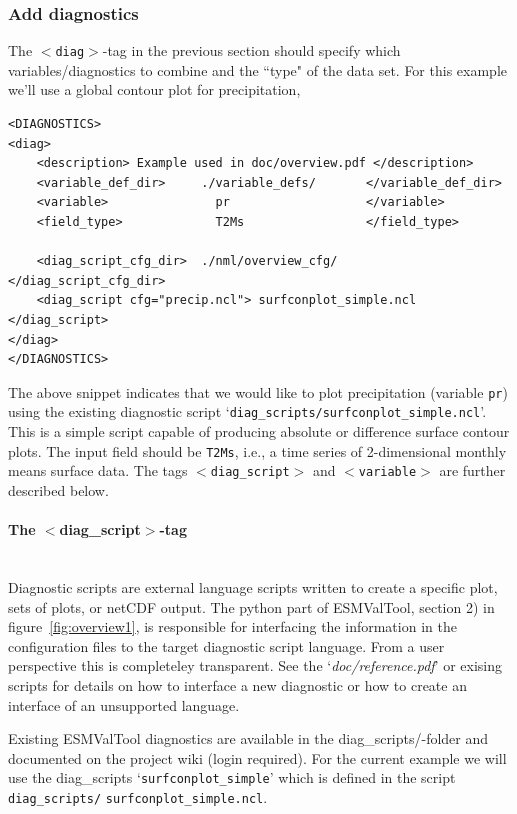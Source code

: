 \documentclass[12pt]{article}
\newcommand{\docref}[1]{`\emph{#1}'}
\newcommand{\xmltag}[1]{\texttt{$<$#1$>$}}
\begin{document}
\subsubsection{Add diagnostics}\label{subsubsection:addDiagnostics}
The \xmltag{diag}-tag in the previous section should specify which
variables/\-diagnostics to combine and the ``type" of the data set.
For this example we'll use a global contour plot for precipitation,
\begin{Verbatim}[frame=single, fontsize=\footnotesize]
<DIAGNOSTICS>
<diag>
    <description> Example used in doc/overview.pdf </description>
    <variable_def_dir>     ./variable_defs/       </variable_def_dir>
    <variable>               pr                   </variable>
    <field_type>             T2Ms                 </field_type>

    <diag_script_cfg_dir>  ./nml/overview_cfg/    </diag_script_cfg_dir>
    <diag_script cfg="precip.ncl"> surfconplot_simple.ncl  </diag_script>
</diag>
</DIAGNOSTICS>
\end{Verbatim}
The above snippet indicates that we would like to plot precipitation
(variable \texttt{pr}) using the existing diagnostic script 
`\texttt{diag\_scripts/surfconplot\_simple.ncl}'. This is a simple
script capable of producing absolute or difference surface contour
plots. The input field should be \texttt{T2Ms}, i.e., a time series of
2-dimen\-sion\-al monthly means surface data. The tags
\xmltag{diag\_script} and \xmltag{variable} are further described
below.

\paragraph{The $<$diag\_script$>$-tag}
~\\
Diagnostic scripts are external language scripts written to create a
specific plot, sets of plots, or netCDF output. The python part of
ESMValTool, section 2) in figure~\ref{fig:overview1}, is responsible
for interfacing the information in the configuration files to the
target diagnostic script language. From a user perspective this is
completeley transparent. See the \docref{doc/reference.pdf} or exising
scripts for details on how to interface a new diagnostic or how to
create an interface of an unsupported language.

Existing ESMValTool diagnostics are available in the
diag\_scripts/-folder and documented on the project
wiki\cite{ESMValTool_wiki} (login required). For the current example
we will use the diag\_scripts `\texttt{surfconplot\_simple}' which is
defined in the script \texttt{diag\_scripts/}
\texttt{surfconplot\_simple.ncl}.
\end{document}
